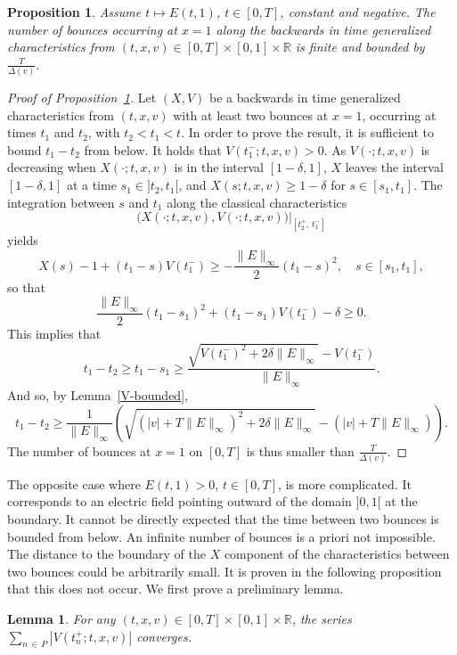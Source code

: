 \documentclass[10pt]{amsart}
\newtheorem{lemm}[theo]{Lemma}\newtheorem{prop}[theo]{Proposition}\newtheorem{coro}[theo]{Corollary}\newtheorem{conj}[theo]{Conjecture}
\theoremstyle{definition}\newtheorem{defi}[theo]{Definition}\newtheorem{rema}[theo]{Remark}\newtheorem{exam}[theo]{Example}\newtheorem{exem}[theo]{Example}\newtheorem{nota}[theo]{Notation}
\newcommand{\R}{\mathbb{R}}
\begin{document}
\begin{prop}\label{cas-simple}
Assume $t \mapsto E(t,1)$, $t \in [0,T]$, constant and negative. 
The number of bounces occurring at $x=1$ along the backwards in time generalized characteristics from $(t,x,v)\in [0,T] \times [0,1] \times \R $ is finite and bounded by $\frac{T}{\Delta(v)}$.
\end{prop}


\begin{proof}[{Proof of Proposition~\ref{cas-simple}}]
Let $(X,V)$ be a backwards in time generalized characteristics from $(t,x,v)$ with at least two bounces at $x=1$, occurring at times $t_1$ and $t_2$, with $t_2<t_1<t$. In order to prove the result, it is sufficient to bound $t_1-t_2$ from below.
It holds that $V(t_1^-;t,x,v)>0$. As $V(\cdot;t,x,v)$ is decreasing when $X(\cdot;t,x,v)$ is in the interval $[1-\delta,1]$, $X$ leaves the interval $[1-\delta,1]$ at a time $s_1\in]t_2,t_1[$, and $X(s;t,x,v) \geq 1-\delta$ for $s \in [s_1,t_1]$. The integration between $s$ and $t_1$ along the classical characteristics
\[
\big(X(\cdot ;t,x,v),V(\cdot ;t,x,v)\big)\big |_{\left[t_2^+,\,t_1^-\right]}
\]
yields
\[
X(s) - 1 + \left(t_1-s\right) V\left(t_1^-\right) \geq -\frac{\|E\|_{\infty }}{2} \left(t_1-s\right)^2, \quad s \in \left[s_1, t_1\right],
\]
so that
\[
\frac{\|E\|_{\infty }}{2} \left(t_1-s_1\right)^2 + \left(t_1 - s_1\right) V\left(t_1^-\right) - \delta \geq 0.
\]
This implies that
\[
t_1-t_2 \geq t_1 - s_1 \geq \frac{\sqrt{V\left(t_1^-\right)^2 + 2 \delta \|E\|_{\infty }}-V\left(t_1^-\right)}{\|E\|_{\infty }}.
\]
And so, by Lemma~\ref{V-bounded},
\[
t_1-t_2 \geq \frac{1}{\|E\|_{\infty }} \left (\sqrt{ \left (|v| + T \|E\|_{\infty } \right)^2 +2\delta \|E\|_{\infty } } - \left (|v| + T \|E\|_{\infty } \right)\right).
\]
The number of bounces at $x=1$ on $[0,T]$ is thus smaller than $\frac{T}{\Delta(v)}$.
\end{proof}

The opposite case where $E(t,1)>0$, $t\in [0,T]$, is more complicated. It corresponds to an electric field pointing outward of the domain $]0,1[$ at the boundary. It cannot be directly expected that the time between two bounces is bounded from below. An infinite number of bounces is a priori not impossible. The distance to the boundary of the $X$ component of the characteristics between two bounces could be arbitrarily small. It is proven in the following proposition that this does not occur. We first prove a preliminary lemma.

\begin{lemm}\label{convergent_series}
For any $(t,x,v)\in [0,T] \times [0,1] \times \R $, the series $\sum_{n\,\in\,P} |V(t_n^+;t,x,v)|$ converges.
\end{lemm}
\end{document}
